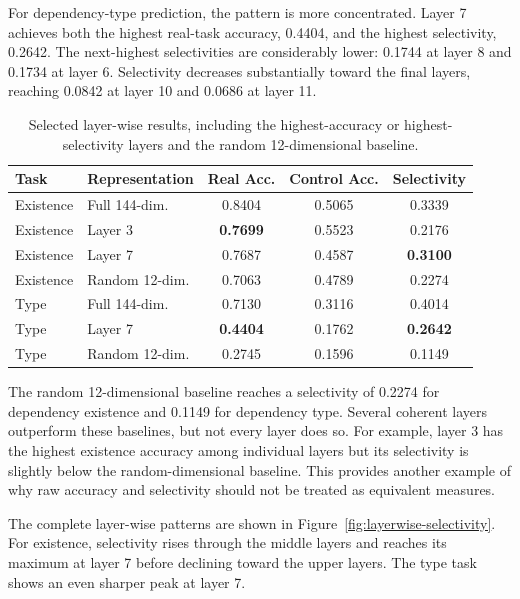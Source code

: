 \documentclass[12pt,a4paper]{article}
\begin{document}
For dependency-type prediction, the pattern is more concentrated. Layer 7 achieves both the highest real-task accuracy, 0.4404, and the highest selectivity, 0.2642. The next-highest selectivities are considerably lower: 0.1744 at layer 8 and 0.1734 at layer 6. Selectivity decreases substantially toward the final layers, reaching 0.0842 at layer 10 and 0.0686 at layer 11.

\begin{table}[htbp]
\centering
\small
\caption{Selected layer-wise results, including the highest-accuracy or highest-selectivity layers and the random 12-dimensional baseline.}
\label{tab:layer-results}
\begin{tabular}{llccc}
\toprule
\textbf{Task} & \textbf{Representation} & \textbf{Real Acc.} & \textbf{Control Acc.} & \textbf{Selectivity} \\
\midrule
Existence & Full 144-dim. & 0.8404 & 0.5065 & 0.3339 \\
Existence & Layer 3 & \textbf{0.7699} & 0.5523 & 0.2176 \\
Existence & Layer 7 & 0.7687 & 0.4587 & \textbf{0.3100} \\
Existence & Random 12-dim. & 0.7063 & 0.4789 & 0.2274 \\
\midrule
Type & Full 144-dim. & 0.7130 & 0.3116 & 0.4014 \\
Type & Layer 7 & \textbf{0.4404} & 0.1762 & \textbf{0.2642} \\
Type & Random 12-dim. & 0.2745 & 0.1596 & 0.1149 \\
\bottomrule
\end{tabular}
\end{table}

The random 12-dimensional baseline reaches a selectivity of 0.2274 for dependency existence and 0.1149 for dependency type. Several coherent layers outperform these baselines, but not every layer does so. For example, layer 3 has the highest existence accuracy among individual layers but its selectivity is slightly below the random-dimensional baseline. This provides another example of why raw accuracy and selectivity should not be treated as equivalent measures.

The complete layer-wise patterns are shown in Figure~\ref{fig:layerwise-selectivity}. For existence, selectivity rises through the middle layers and reaches its maximum at layer 7 before declining toward the upper layers. The type task shows an even sharper peak at layer 7.
\end{document}
